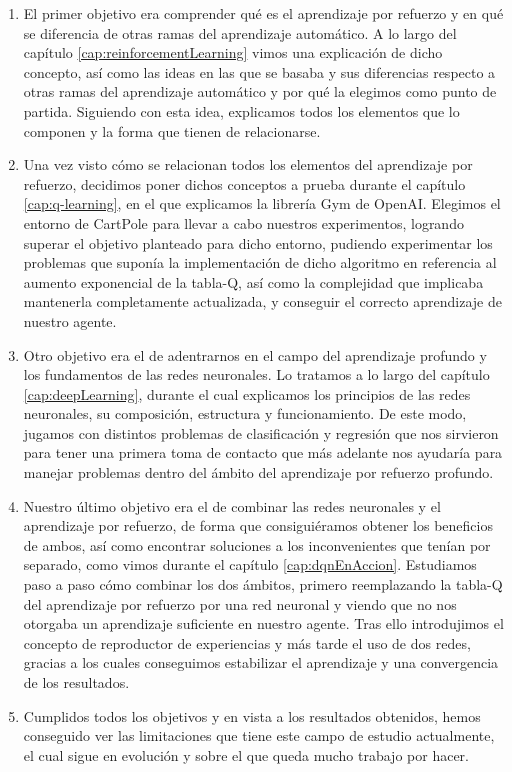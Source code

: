 \begin{enumerate}
        \item El primer objetivo era comprender qué es el aprendizaje por refuerzo y en qué se diferencia de otras ramas del aprendizaje automático. A lo largo del capítulo \ref{cap:reinforcementLearning} vimos una explicación de dicho concepto, así como las ideas en las que se basaba y sus diferencias respecto a otras ramas del aprendizaje automático y por qué la elegimos como punto de partida. Siguiendo con esta idea, explicamos todos los elementos que lo componen y la forma que tienen de relacionarse.
        \item Una vez visto cómo se relacionan todos los elementos del aprendizaje por refuerzo, decidimos poner dichos conceptos a prueba durante el capítulo \ref{cap:q-learning}, en el que explicamos la librería Gym de OpenAI. Elegimos el entorno de CartPole para llevar a cabo nuestros experimentos, logrando superar el objetivo planteado para dicho entorno, pudiendo experimentar los problemas que suponía la implementación de dicho algoritmo en referencia al aumento exponencial de la tabla-Q, así como la complejidad que implicaba mantenerla completamente actualizada, y conseguir el correcto aprendizaje de nuestro agente.
        \item Otro objetivo era el de adentrarnos en el campo del aprendizaje profundo y los fundamentos de las redes neuronales. Lo tratamos a lo largo del capítulo \ref{cap:deepLearning}, durante el cual explicamos los principios de las redes neuronales, su composición, estructura y funcionamiento. De este modo, jugamos con distintos problemas de clasificación y regresión que nos sirvieron para tener una primera toma de contacto que más adelante nos ayudaría para manejar problemas dentro del ámbito del aprendizaje por refuerzo profundo.
        \item Nuestro último objetivo era el de combinar las redes neuronales y el aprendizaje por refuerzo, de forma que consiguiéramos obtener los beneficios de ambos, así como encontrar soluciones a los inconvenientes que tenían por separado, como vimos durante el capítulo \ref{cap:dqnEnAccion}. Estudiamos paso a paso cómo combinar los dos ámbitos, primero reemplazando la tabla-Q del aprendizaje por refuerzo por una red neuronal y viendo que no nos otorgaba un aprendizaje suficiente en nuestro agente. Tras ello introdujimos el concepto de reproductor de experiencias y más tarde el uso de dos redes, gracias a los cuales conseguimos estabilizar el aprendizaje y una convergencia de los resultados.
        \item Cumplidos todos los objetivos y en vista a los resultados obtenidos, hemos conseguido ver las limitaciones que tiene este campo de estudio actualmente, el cual sigue en evolución y sobre el que queda mucho trabajo por hacer.
\end{enumerate}

